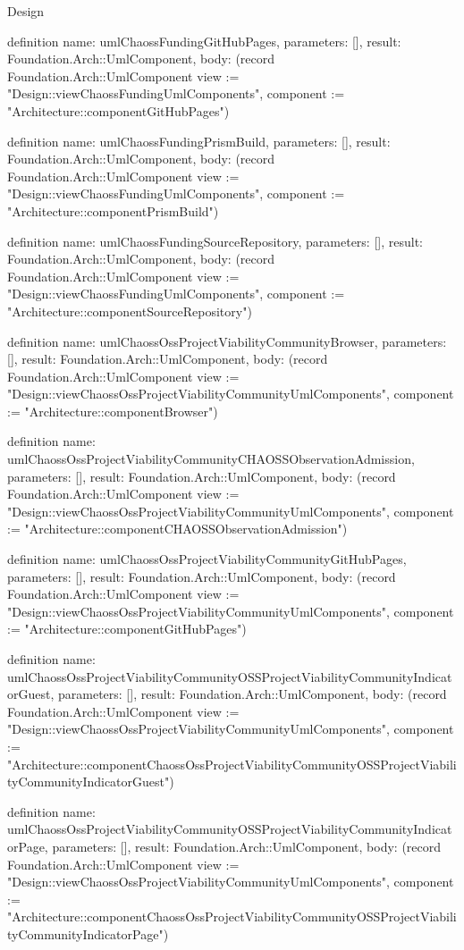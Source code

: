 \begin{lexlean}{Design}
\begin{semanticmodule}
definition{
  name: umlChaossFundingGitHubPages,
  parameters: [],
  result: Foundation.Arch::UmlComponent,
  body: (record Foundation.Arch::UmlComponent {view := "Design::viewChaossFundingUmlComponents", component := "Architecture::componentGitHubPages"})
}

definition{
  name: umlChaossFundingPrismBuild,
  parameters: [],
  result: Foundation.Arch::UmlComponent,
  body: (record Foundation.Arch::UmlComponent {view := "Design::viewChaossFundingUmlComponents", component := "Architecture::componentPrismBuild"})
}

definition{
  name: umlChaossFundingSourceRepository,
  parameters: [],
  result: Foundation.Arch::UmlComponent,
  body: (record Foundation.Arch::UmlComponent {view := "Design::viewChaossFundingUmlComponents", component := "Architecture::componentSourceRepository"})
}

definition{
  name: umlChaossOssProjectViabilityCommunityBrowser,
  parameters: [],
  result: Foundation.Arch::UmlComponent,
  body: (record Foundation.Arch::UmlComponent {view := "Design::viewChaossOssProjectViabilityCommunityUmlComponents", component := "Architecture::componentBrowser"})
}

definition{
  name: umlChaossOssProjectViabilityCommunityCHAOSSObservationAdmission,
  parameters: [],
  result: Foundation.Arch::UmlComponent,
  body: (record Foundation.Arch::UmlComponent {view := "Design::viewChaossOssProjectViabilityCommunityUmlComponents", component := "Architecture::componentCHAOSSObservationAdmission"})
}

definition{
  name: umlChaossOssProjectViabilityCommunityGitHubPages,
  parameters: [],
  result: Foundation.Arch::UmlComponent,
  body: (record Foundation.Arch::UmlComponent {view := "Design::viewChaossOssProjectViabilityCommunityUmlComponents", component := "Architecture::componentGitHubPages"})
}

definition{
  name: umlChaossOssProjectViabilityCommunityOSSProjectViabilityCommunityIndicatorGuest,
  parameters: [],
  result: Foundation.Arch::UmlComponent,
  body: (record Foundation.Arch::UmlComponent {view := "Design::viewChaossOssProjectViabilityCommunityUmlComponents", component := "Architecture::componentChaossOssProjectViabilityCommunityOSSProjectViabilityCommunityIndicatorGuest"})
}

definition{
  name: umlChaossOssProjectViabilityCommunityOSSProjectViabilityCommunityIndicatorPage,
  parameters: [],
  result: Foundation.Arch::UmlComponent,
  body: (record Foundation.Arch::UmlComponent {view := "Design::viewChaossOssProjectViabilityCommunityUmlComponents", component := "Architecture::componentChaossOssProjectViabilityCommunityOSSProjectViabilityCommunityIndicatorPage"})
}


\end{semanticmodule}
\end{lexlean}

